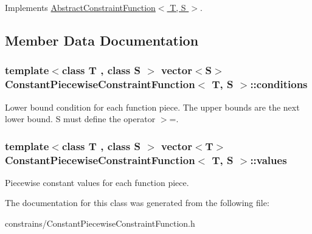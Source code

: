 Implements \hyperlink{class_abstract_constraint_function}{Abstract\+Constraint\+Function$<$ T, S $>$}.



\subsection{Member Data Documentation}
\subsubsection[{\texorpdfstring{conditions}{conditions}}]{\setlength{\rightskip}{0pt plus 5cm}template$<$class T , class S $>$ vector$<$S$>$ {\bf Constant\+Piecewise\+Constraint\+Function}$<$ T, S $>$\+::conditions\hspace{0.3cm}{\ttfamily [private]}}\hypertarget{class_constant_piecewise_constraint_function_af28fe38d8c5c4a9a805c8a46d35cd4b2}{}\label{class_constant_piecewise_constraint_function_af28fe38d8c5c4a9a805c8a46d35cd4b2}
Lower bound condition for each function piece. The upper bounds are the next lower bound. S must define the operator $>$=. 
\subsubsection[{\texorpdfstring{values}{values}}]{\setlength{\rightskip}{0pt plus 5cm}template$<$class T , class S $>$ vector$<$T$>$ {\bf Constant\+Piecewise\+Constraint\+Function}$<$ T, S $>$\+::values\hspace{0.3cm}{\ttfamily [private]}}\hypertarget{class_constant_piecewise_constraint_function_ae26530a2cd1a3ce9150b68fb16d5423e}{}\label{class_constant_piecewise_constraint_function_ae26530a2cd1a3ce9150b68fb16d5423e}
Piecewise constant values for each function piece. 

The documentation for this class was generated from the following file\+:\begin{DoxyCompactItemize}
\item 
constrains/Constant\+Piecewise\+Constraint\+Function.\+h\end{DoxyCompactItemize}
